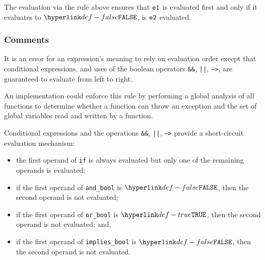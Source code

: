 
\begin{mathpar}
\end{mathpar}
The evaluation via the rule above ensures that $\veone$ is evaluated first and only if
it evaluates to $\False$, is $\vetwo$ evaluated.

\subsubsection{Comments}


It is an error for an expression’s meaning to rely on
evaluation order except that conditional expressions, and uses of the boolean
operators \texttt{\&\&}, \texttt{||}, \texttt{-->}, are guaranteed to evaluate
from left to right.


An implementation could enforce this rule by performing a global analysis of
all functions to determine whether a function can throw an exception and the
set of global variables read and written by a function.

Conditional expressions and the operations \texttt{\&\&}, \texttt{||},
\texttt{-->} provide a short-circuit evaluation mechanism:

\begin{itemize}
\item the first operand of \texttt{if} is always evaluated but only one of the
remaining operands is evaluated;
\item if the first operand of \texttt{and\_bool} is $\False$, then the second operand is not evaluated;
\item if the first operand of \texttt{or\_bool} is $\True$, then the second operand is not evaluated; and,
\item if the first operand of \texttt{implies\_bool} is $\False$, then the
second operand is not evaluated.
\end{itemize}

